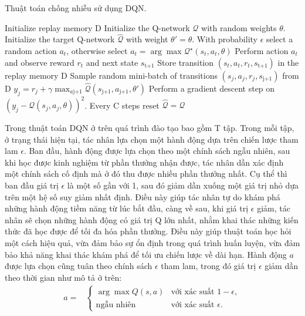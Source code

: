 \documentclass{uetgraduation}
\begin{document}
\begin{algorithm}
    \caption{Thuật toán chống nhiễu sử dụng DQN.}\label{alg:dqn}
    \begin{algorithmic}[1]
    \State Initialize replay memory D
    \State Initialize the Q-network $\mathcal{Q}$ with random weights $\theta$.
    \State Initialize the target Q-network $\hat{\mathcal{Q}}$ with weight $\theta' = \theta$.
        \State With probability $\epsilon$ select a random action $a_t$, otherwise select $a_t = \arg \max \mathcal{Q}^\star (s_t, a_t, \theta)$
        \State Perform action $a_t$ and observe reward $r_t$ and next state $s_\text{t+1}$
        \State Store transition $(s_t,a_t,r_t,s_\text{t+1})$ in the replay memory D
        \State Sample random mini-batch of transitions $(s_j,a_j,r_j,s_\text{j+1})$ from D
        \State $y_j = r_j + \gamma \max_{a\text{j+1}} \hat{\mathcal{Q}} (s_\text{j+1}, a_\text{j+1}, \theta')$
        \State Perform a gradient descent step on $(y_j - \mathcal{Q} (s_j, a_j, \theta))^2$.
        \State Every C steps reset $\hat{\mathcal{Q}} = \mathcal{Q}$
    \EndFor
\end{algorithmic}
\end{algorithm}

Trong thuật toán DQN ở trên quá trình đào tạo bao gồm T tập. Trong mỗi tập, ở trạng thái hiện tại, tác nhân lựa chọn một hành động dựa trên chiến lược tham lam $\epsilon$.
Ban đầu, hành động được lựa chọn theo một chính sách ngẫu nhiên, sau khi học được kinh nghiệm từ phần thưởng nhận được, tác nhân dần xác định một chính sách cố định mà ở
đó thu được nhiều phần thưởng nhất. Cụ thể thì ban đầu giá trị $\epsilon$ là một số gần với 1, sau đó giảm dần xuống một giá trị nhỏ dựa trên một hệ số suy giảm nhất định.
Điều này giúp tác nhân tự do khám phá những hành động tiềm năng từ lúc bắt đầu, càng về sau, khi giá trị $\epsilon$ giảm, tác nhân sẽ chọn những hành động có giá trị Q lớn
nhất, nhằm khai thác những kiến thức đã học được để tối đa hóa phần thưởng. Điều này giúp thuật toán học hỏi một cách hiệu quả, vừa đảm bảo sự ổn định trong quá trình
huấn luyện, vừa đảm bảo khả năng khai thác khám phá để tối ưu chiến lược về dài hạn. Hành động $a$ được lựa chọn cũng tuân theo chính sách $\epsilon$ tham lam, trong đó
giá trị $\epsilon$ giảm dần theo thời gian như mô tả ở trên:
\begin{align*}
    a =& \begin{cases}
        \arg \max Q(s, a) & \text{với xác suất } 1 - \epsilon, \\ 
        \text{ngẫu nhiên} & \text{với xác suất } \epsilon.
    \end{cases}
\end{align*}
\end{document}
